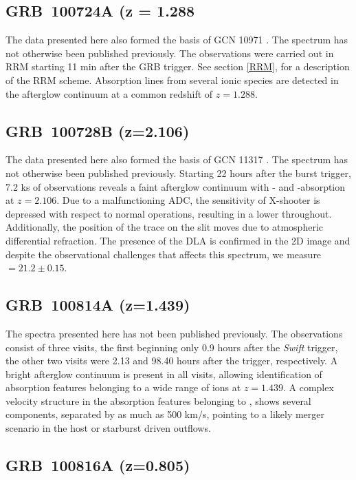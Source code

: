 \documentclass[longauth]{aa}    %
\begin{document}
\subsection{GRB~100724A (z = 1.288} \label{100724}

The data presented here also formed the basis of GCN 10971 \citep{GCN10971}. The
spectrum has not otherwise been published previously. The observations were
carried out in RRM starting 11 min after the GRB trigger. See section \ref{RRM},
for a description of the RRM scheme. Absorption lines from several ionic species
are detected in the afterglow continuum at a common redshift of $z = 1.288$.

\subsection{GRB~100728B (z=2.106)} \label{100728}

The data presented here also formed the basis of GCN 11317 \citep{GCN11317}. The
spectrum has not otherwise been published previously. Starting 22 hours after
the burst trigger, 7.2 ks of observations reveals a faint afterglow continuum
with \lya- and \mgii-absorption at $z=2.106$. Due to a malfunctioning ADC, the
sensitivity of X-shooter is depressed with respect to normal operations,
resulting in a lower throughout. Additionally, the position of the trace on the
slit moves due to atmospheric differential refraction. The presence of the DLA
is confirmed in the 2D image and despite the observational challenges that
affects this spectrum, we measure \nh~$=21.2 \pm 0.15$.

\subsection{GRB~100814A (z=1.439)} \label{100814}

The spectra presented here has not been published previously. The observations
consist of three visits, the first beginning only 0.9 hours after the
\textit{Swift} trigger, the other two visits were 2.13 and 98.40 hours after the
trigger, respectively. A bright afterglow continuum is present in all visits,
allowing identification of absorption features belonging to a wide range of ions
at $z=1.439$. A complex velocity structure in the absorption features belonging
to \mgii, shows several components, separated by as much as 500 km/s, pointing to
a likely merger scenario in the host or starburst driven outflows.

\subsection{GRB~100816A (z=0.805)} \label{100816}
\end{document}
